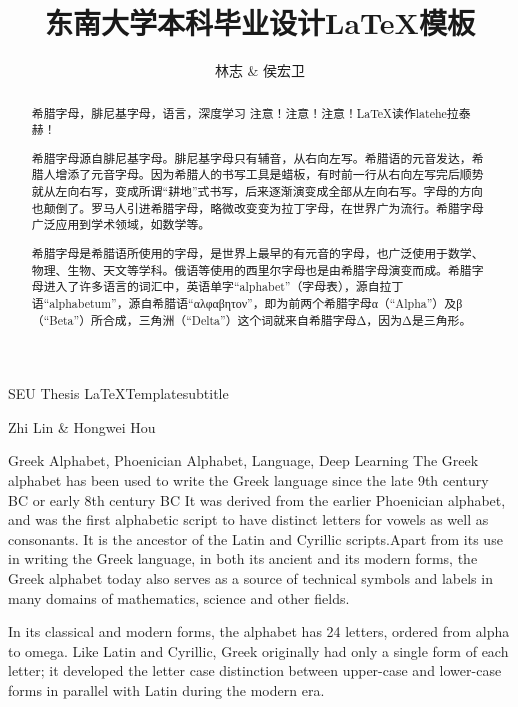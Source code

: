 \documentclass[bachelor, nocolorlinks, printoneside]{seuthesis} %
\begin{document}

\title{东南大学本科毕业设计\LaTeX 模板}{}{SEU Thesis \LaTeX Template}{subtitle}
\author{林志 \& 侯宏卫}{Zhi Lin \& Hongwei Hou}




\maketitle

\begin{abstract}{希腊字母，腓尼基字母，语言，深度学习}
注意！注意！注意！\LaTeX 读作latehe拉泰赫！

希腊字母源自腓尼基字母。腓尼基字母只有辅音，从右向左写。希腊语的元音发达，希腊人增添了元音字母。因为希腊人的书写工具是蜡板，有时前一行从右向左写完后顺势就从左向右写，变成所谓“耕地”式书写，后来逐渐演变成全部从左向右写。字母的方向也颠倒了。罗马人引进希腊字母，略微改变变为拉丁字母，在世界广为流行。希腊字母广泛应用到学术领域，如数学等。

希腊字母是希腊语所使用的字母，是世界上最早的有元音的字母，也广泛使用于数学、物理、生物、天文等学科。俄语等使用的西里尔字母也是由希腊字母演变而成。希腊字母进入了许多语言的词汇中，英语单字“alphabet”（字母表），源自拉丁语“alphabetum”，源自希腊语“αλφαβητον”，即为前两个希腊字母α（“Alpha”）及β（“Beta”）所合成，三角洲（“Delta”）这个词就来自希腊字母Δ，因为Δ是三角形。
\end{abstract}

\begin{englishabstract}{Greek Alphabet, Phoenician Alphabet, Language, Deep Learning}
The Greek alphabet has been used to write the Greek language since the late 9th century BC or early 8th century BC It was derived from the earlier Phoenician alphabet, and was the first alphabetic script to have distinct letters for vowels as well as consonants. It is the ancestor of the Latin and Cyrillic scripts.Apart from its use in writing the Greek language, in both its ancient and its modern forms, the Greek alphabet today also serves as a source of technical symbols and labels in many domains of mathematics, science and other fields.

In its classical and modern forms, the alphabet has 24 letters, ordered from alpha to omega. Like Latin and Cyrillic, Greek originally had only a single form of each letter; it developed the letter case distinction between upper-case and lower-case forms in parallel with Latin during the modern era.
\end{englishabstract}
\end{document}
